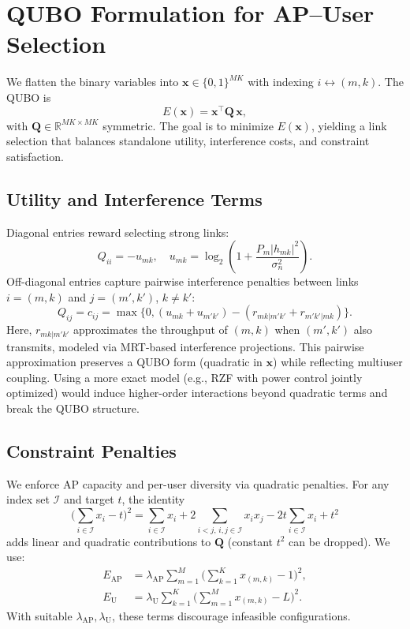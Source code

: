 \section{QUBO Formulation for AP–User Selection}
We flatten the binary variables into $\mathbf{x}\in\{0,1\}^{MK}$ with indexing $i\leftrightarrow (m,k)$. The QUBO is
\begin{equation}
E(\mathbf{x})=\mathbf{x}^\top \mathbf{Q}\,\mathbf{x},
\end{equation}
with $\mathbf{Q}\in\mathbb{R}^{MK\times MK}$ symmetric. The goal is to minimize $E(\mathbf{x})$, yielding a link selection that balances standalone utility, interference costs, and constraint satisfaction.

\subsection{Utility and Interference Terms}
Diagonal entries reward selecting strong links:
\begin{equation}
Q_{ii}=-u_{mk},\quad u_{mk}=\log_2\!\left(1+\frac{P_m|h_{mk}|^2}{\sigma_n^2}\right).
\end{equation}
Off-diagonal entries capture pairwise interference penalties between links $i=(m,k)$ and $j=(m',k')$, $k\neq k'$:
\begin{equation}
Q_{ij}=c_{ij}=\max\!\Big\{0,(u_{mk}+u_{m'k'}) -(r_{mk|m'k'}+r_{m'k'|mk})\Big\}.
\end{equation}
Here, $r_{mk|m'k'}$ approximates the throughput of $(m,k)$ when $(m',k')$ also transmits, modeled via MRT-based interference projections. This pairwise approximation preserves a QUBO form (quadratic in $\mathbf{x}$) while reflecting multiuser coupling. Using a more exact model (e.g., RZF with power control jointly optimized) would induce higher-order interactions beyond quadratic terms and break the QUBO structure.

\subsection{Constraint Penalties}
We enforce AP capacity and per-user diversity via quadratic penalties. For any index set $\mathcal{I}$ and target $t$, the identity
\begin{equation}
\bigg(\sum_{i\in \mathcal{I}} x_i - t\bigg)^2=\sum_{i\in\mathcal{I}}x_i + 2\!\!\sum_{i<j,\,i,j\in\mathcal{I}}\!\! x_ix_j - 2t\sum_{i\in\mathcal{I}}x_i + t^2
\end{equation}
adds linear and quadratic contributions to $\mathbf{Q}$ (constant $t^2$ can be dropped). We use:
\begin{align}
E_{\text{AP}}&=\lambda_{\text{AP}} \sum_{m=1}^M \Big(\sum_{k=1}^K x_{(m,k)} - 1\Big)^2,\\
E_{\text{U}}&=\lambda_{\text{U}} \sum_{k=1}^K \Big(\sum_{m=1}^M x_{(m,k)} - L\Big)^2.
\end{align}
With suitable $\lambda_{\text{AP}},\lambda_{\text{U}}$, these terms discourage infeasible configurations.

